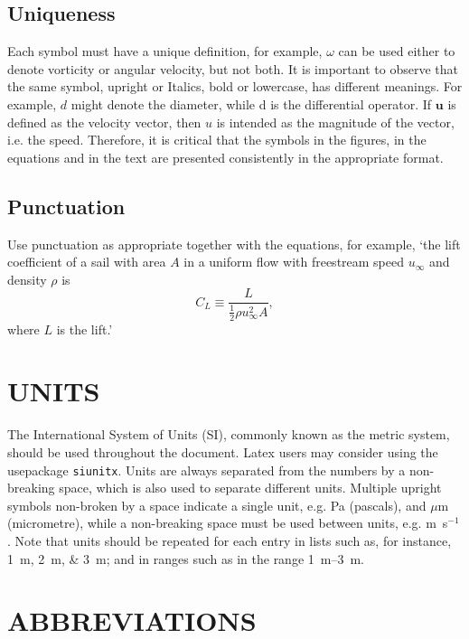 \documentclass{article}
\begin{document}
\subsection{Uniqueness}

Each symbol must have a unique definition, for example, $\omega$ can be used either to denote vorticity or angular velocity, but not both. It is important to observe that the same symbol, upright or Italics, bold or lowercase, has different meanings. For example, $d$ might denote the diameter, while d is the differential operator. If $\bm{u}$ is defined as the velocity vector, then $u$ is intended as the magnitude of the vector, i.e. the speed. Therefore, it is critical that the symbols in the figures, in the equations and in the text are presented consistently in the appropriate format.  

\subsection{Punctuation}

Use punctuation as appropriate together with the equations, for example, `the lift coefficient of a sail with area $A$ in a uniform flow with freestream speed $u_\infty$ and density $\rho$ is
\begin{equation}\label{eq:CL}
    C_L\equiv \frac{L}{\frac{1}{2}\rho u_\infty^2 A},
\end{equation}\noindent
where $L$ is the lift.'  

\section{UNITS}\label{sec:units}

The International System of Units (SI), commonly known as the metric system, should be used throughout the document. Latex users may consider using the usepackage {\tt siunitx}. Units are always separated from the numbers by a non-breaking space, which is also used to separate different units. Multiple upright symbols non-broken by a space indicate a single unit, e.g. Pa (pascals), and $\mu$m (micrometre), while a non-breaking space must be used between units, e.g. m~s$^{-1}$. Note that units should be repeated for each entry in lists such as, for instance, \SIlist{1;2;3}{m}; and in ranges such as in the range \SIrange{1}{3}{m}. 


\section{ABBREVIATIONS}\label{sec:abbreviations}
\end{document}
